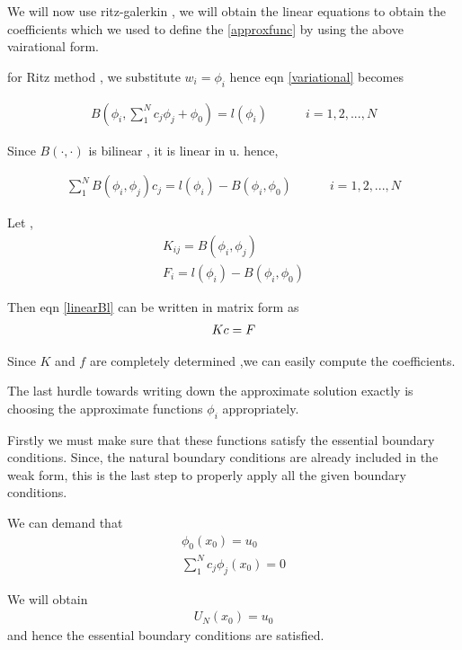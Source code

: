 We will now use ritz-galerkin , we will obtain the linear equations to obtain the coefficients which we used to define the \ref{approxfunc} by using the above vairational form.

for Ritz method , we substitute $w_i = \phi_i$ hence eqn \ref{variational} becomes

\begin{eqnarray}
	B \left(\phi_i, \sum_{1}^{N} c_j \phi_j + \phi_0 \right) = l(\phi_i)  \quad\quad\quad i = 1,2,...,N
\end{eqnarray}

Since $B(\cdot , \cdot ) $ is bilinear , it is linear in u. hence,

\begin{eqnarray} \label{linearBl}
	\sum_{1}^{N} B \left(\phi_i, \phi_j \right)  c_j  = l(\phi_i) -  B \left(\phi_i, \phi_0 \right)  \quad\quad\quad i = 1,2,...,N
\end{eqnarray}

Let , 
\begin{eqnarray}\label{gencoeff}
	K_{ij} = B(\phi_i , \phi_j) \\
	F_i = l(\phi_i) - B(\phi_i , \phi_0)
\end{eqnarray}

Then eqn \ref{linearBl} can be written in matrix form as
\begin{eqnarray}
	\boldmath{K} c = \boldmath{F}
\end{eqnarray}

Since $K$ and $f$ are completely determined ,we can easily compute the coefficients.

The last hurdle towards writing down the approximate solution exactly is choosing the approximate functions $\phi_i$ appropriately.

Firstly we must make sure that these functions satisfy the essential boundary conditions. Since, the natural boundary conditions are already included in the weak form, this is the last step to properly apply all the given boundary conditions.

We can demand that
\begin{eqnarray}
	\phi_0(x_0) = u_0\\
	\sum_{1}^{N} c_j \phi_j(x_0) = 0
\end{eqnarray} 

We will obtain 
\begin{eqnarray}
	U_N(x_0) = u_0
\end{eqnarray}
and hence the essential boundary conditions are satisfied.
 
